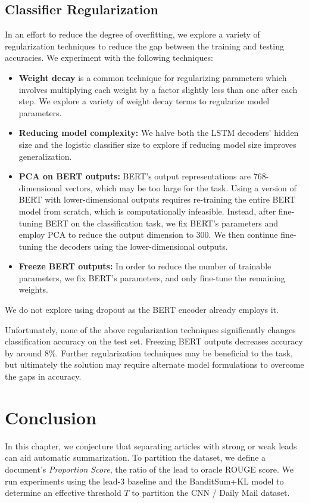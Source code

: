 \subsection{Classifier Regularization}
In an effort to reduce the degree of overfitting, we explore a variety of regularization techniques to reduce the gap between the training and testing accuracies. We experiment with the following techniques:
\begin{itemize}
    \item \textbf{Weight decay} is a common technique for regularizing parameters which involves multiplying each weight by a factor slightly less than one after each step. We explore a variety of weight decay terms to regularize model parameters.
    \item \textbf{Reducing model complexity:} We halve both the LSTM decoders' hidden size and the logistic classifier size to explore if reducing model size improves generalization.
    \item \textbf{PCA on BERT outputs:} BERT's output representations are 768-dimensional vectors, which may be too large for the task. Using a version of BERT with lower-dimensional outputs requires re-training the entire BERT model from scratch, which is computationally infeasible. Instead, after fine-tuning BERT on the classification task, we fix BERT's parameters and employ PCA to reduce the output dimension to 300. We then continue fine-tuning the decoders using the lower-dimensional outputs.
    \item \textbf{Freeze BERT outputs:} In order to reduce the number of trainable parameters, we fix BERT's parameters, and only fine-tune the remaining weights.
\end{itemize}
We do not explore using dropout as the BERT encoder already employs it.

Unfortunately, none of the above regularization techniques significantly changes classification accuracy on the test set. Freezing BERT outputs decreases accuracy by around 8\%. Further regularization techniques may be beneficial to the task, but ultimately the solution may require alternate model formulations to overcome the gaps in accuracy.

\vspace{-4px}
\section{Conclusion}
In this chapter, we conjecture that separating articles with strong or weak leads can aid automatic summarization. To partition the dataset, we define a document's \textit{Proportion Score}, the ratio of the lead to oracle ROUGE score. We run experiments using the lead-3 baseline and the BanditSum+KL model to determine an effective threshold $T$ to partition the CNN / Daily Mail dataset.

